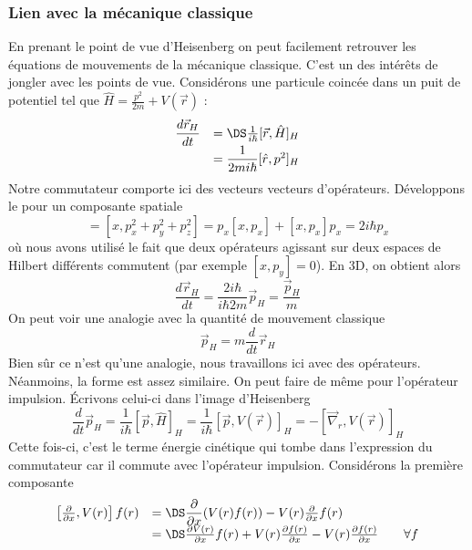 \subsubsection{Lien avec la mécanique classique}

En prenant le point de vue d'Heisenberg on peut facilement 
retrouver les équations de mouvements de la mécanique classique. C'est un des intérêts de 
jongler avec les points de vue. Considérons une particule coincée dans un puit de potentiel tel que $\hat{H}=\frac{p^2}{2m}+V(\vec{r})$ :
\begin{equation}
\begin{array}{ll}
\dfrac{d\vec{r}_H}{dt} &=\DS \frac{1}{i\hbar}[\vec{r},\hat{H}]_H\\
&= \dfrac{1}{2m i\hbar}[\hat{r},p^2]_H
\end{array}
\end{equation}
Notre commutateur comporte ici des vecteurs vecteurs d'opérateurs. Développons le pour un composante spatiale
\begin{equation}
[x,p^2] = [x, p_x^2+p_y^2+p_z^2] = p_x[x,p_x]+[x,p_x]p_x = 2i\hbar p_x
\end{equation}
où nous avons utilisé le fait que deux opérateurs agissant sur deux espaces de Hilbert différents 
commutent (par exemple $[x,p_y]=0$). En 3D, on obtient alors
\begin{equation}
\dfrac{d\vec{r}_H}{dt} =  \dfrac{2i\hbar}{i \hbar 2 m} \vec{p}_H = \dfrac{\vec{p}_H}{m}
\end{equation}
On peut voir une analogie avec la quantité de mouvement classique
\begin{equation}
\vec{p}_H = m\dfrac{d}{dt}\vec{r}_H 
\end{equation}
Bien sûr ce n'est qu'une analogie, nous travaillons ici avec des opérateurs. Néanmoins, la forme est 
assez similaire. On peut faire de même pour l'opérateur impulsion. Écrivons celui-ci dans l'image 
d'Heisenberg
\begin{equation}
\dfrac{d}{dt}\vec{p}_H = \dfrac{1}{i\hbar}[\vec{p},\hat{H}]_H = \frac{1}{i\hbar}[\vec{p},V(\vec{r})]_H =
-[\vec{\nabla}_r,V(\vec{r})]_H
\end{equation}
Cette fois-ci, c'est le terme énergie cinétique qui tombe dans l'expression du commutateur
car il commute avec l'opérateur impulsion. Considérons 
la première composante
\begin{equation}
\begin{array}{ll}
\left[\frac{\partial}{\partial x}, V(r)\right]f(r) &=\DS \dfrac{\partial}{\partial x}(V(r)f(r)) - V(r)\frac{
\partial}{\partial x}f(r)\\
&=\DS \frac{\partial V(r)}{\partial x}f(r) + V(r)\frac{\partial f(r)}{\partial x}-V(r)\frac{\partial f(r)}{\partial x}\qquad \forall f
\end{array}
\end{equation}
